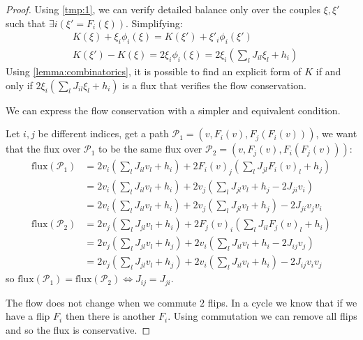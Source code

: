 \begin{theorem}
\begin{proof}
        \noindent Using \cref{tmp:1}, we can verify detailed balance only over the couples $\xi,\xi'$ such that $\exists i\left(\xi'=F_i\left(\xi\right)\right)$. Simplifying:
        \begin{align*}
            &K(\xi) + \xi_i\phi_i(\xi) = K(\xi') + \xi'_i\phi_i(\xi') \\
            &K(\xi')-K(\xi) = 2\xi_i\phi_i(\xi) = 2\xi_i\left(\sum_l J_{il}\xi_l + h_i\right)
        \end{align*}
        Using \cref{lemma:combinatorics}, it is possible to find an explicit form of $K$ if and only if $2\xi_i\left(\sum_l J_{il}\xi_l + h_i\right)$ is a flux that verifies the flow conservation.

        \noindent We can express the flow conservation with a simpler and equivalent condition.

        \noindent Let $i,j$ be different indices, get a path $\mathcal{P}_1=\left(v,F_i(v),F_j(F_i(v))\right)$, we want that the flux over $\mathcal{P}_1$ to be the same flux over $\mathcal{P}_2 = \left(v,F_j(v),F_i(F_j(v))\right)$:
        \begin{align*}
            \text{flux}\left(\mathcal{P}_1\right) &= 2v_i\left(\sum_l J_{il}v_l + h_i\right) + 2F_i(v)_j\left(\sum_l J_{jl}F_i(v)_l + h_j\right) \\
            &= 2v_i\left(\sum_l J_{il}v_l + h_i\right) + 2v_j\left(\sum_l J_{jl}v_l + h_j - 2J_{ji}v_i\right) \\
            &= 2v_i\left(\sum_l J_{il}v_l + h_i\right) + 2v_j\left(\sum_l J_{jl}v_l + h_j\right) - 2J_{ji}v_jv_i \\
            \text{flux}\left(\mathcal{P}_2\right) &= 2v_j\left(\sum_l J_{jl}v_l + h_i\right) + 2F_j(v)_i\left(\sum_l J_{il}F_j(v)_l + h_i\right) \\
            &= 2v_j\left(\sum_l J_{jl}v_l + h_j\right) + 2v_i\left(\sum_l J_{il}v_l + h_i - 2J_{ij}v_j\right) \\
            &= 2v_j\left(\sum_l J_{jl}v_l + h_j\right) + 2v_i\left(\sum_l J_{il}v_l + h_i\right) - 2J_{ij}v_iv_j
        \end{align*}
        so $\text{flux}\left(\mathcal{P}_1\right) = \text{flux}\left(\mathcal{P}_2\right) \iff J_{ij}=J_{ji}$.

        \noindent The flow does not change when we commute $2$ flips. In a cycle we know that if we have a flip $F_i$ then there is another $F_i$. Using commutation we can remove all flips and so the flux is conservative.


\end{proof}
\end{theorem}
